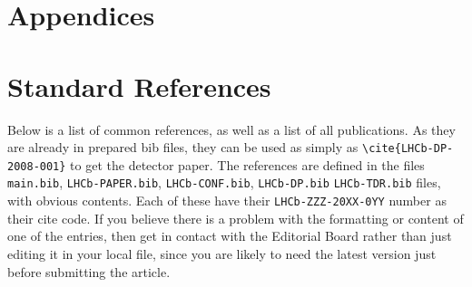 
\section*{Appendices}

\appendix

\section{Standard References}
\label{sec:StandardReferences}
Below is a list of common references, as
well as a list of all \lhcb publications.
As they are already in prepared bib files, they can be used as simply as
\texttt{\textbackslash cite\{LHCb-DP-2008-001\}} to get the \lhcb detector paper.
The references are defined in the files \texttt{main.bib},  \texttt{LHCb-PAPER.bib},
\texttt{LHCb-CONF.bib}, \texttt{LHCb-DP.bib} \texttt{LHCb-TDR.bib} files, with obvious contents.
Each of these have their \texttt{LHCb-ZZZ-20XX-0YY} number as their cite code.
If you believe there is a problem with the formatting or
content of one of the entries, then get in contact with the Editorial
Board rather than just editing it in your local file,
since you are likely to need the latest version just before submitting the article.


